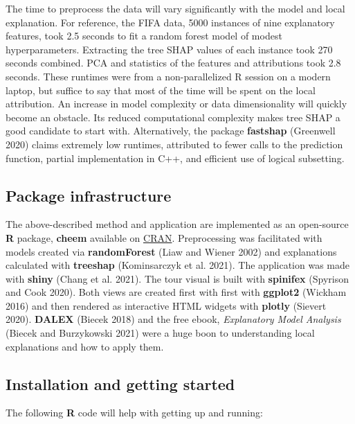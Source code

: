 \documentclass[
]{article}
\begin{document}
The time to preprocess the data will vary significantly with the model and local explanation. For reference, the FIFA data, 5000 instances of nine explanatory features, took 2.5 seconds to fit a random forest model of modest hyperparameters. Extracting the tree SHAP values of each instance took 270 seconds combined. PCA and statistics of the features and attributions took 2.8 seconds. These runtimes were from a non-parallelized R session on a modern laptop, but suffice to say that most of the time will be spent on the local attribution. An increase in model complexity or data dimensionality will quickly become an obstacle. Its reduced computational complexity makes tree SHAP a good candidate to start with. Alternatively, the package \textbf{fastshap} (Greenwell 2020) claims extremely low runtimes, attributed to fewer calls to the prediction function, partial implementation in C++, and efficient use of logical subsetting.

\hypertarget{sec:infrastructure}{%
\subsection{Package infrastructure}\label{sec:infrastructure}}

The above-described method and application are implemented as an open-source \textbf{R} package, \textbf{cheem} available on \href{https://CRAN.R-project.org/package=cheem}{CRAN}. Preprocessing was facilitated with models created via \textbf{randomForest} (Liaw and Wiener 2002) and explanations calculated with \textbf{treeshap} (Kominsarczyk et al. 2021). The application was made with \textbf{shiny} (Chang et al. 2021). The tour visual is built with \textbf{spinifex} (Spyrison and Cook 2020). Both views are created first with first with \textbf{ggplot2} (Wickham 2016) and then rendered as interactive HTML widgets with \textbf{plotly} (Sievert 2020). \textbf{DALEX} (Biecek 2018) and the free ebook, \emph{Explanatory Model Analysis} (Biecek and Burzykowski 2021) were a huge boon to understanding local explanations and how to apply them.

\hypertarget{installation-and-getting-started}{%
\subsection{Installation and getting started}\label{installation-and-getting-started}}

The following \textbf{R} code will help with getting up and running:
\end{document}
